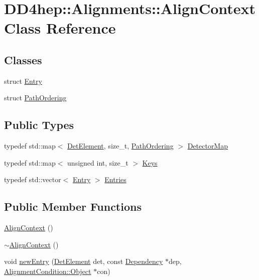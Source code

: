 \hypertarget{class_d_d4hep_1_1_alignments_1_1_align_context}{
\section{DD4hep::Alignments::AlignContext Class Reference}
\label{class_d_d4hep_1_1_alignments_1_1_align_context}
}
\subsection*{Classes}
\begin{DoxyCompactItemize}
\item 
struct \hyperlink{struct_d_d4hep_1_1_alignments_1_1_align_context_1_1_entry}{Entry}
\item 
struct \hyperlink{struct_d_d4hep_1_1_alignments_1_1_align_context_1_1_path_ordering}{PathOrdering}
\end{DoxyCompactItemize}
\subsection*{Public Types}
\begin{DoxyCompactItemize}
\item 
typedef std::map$<$ \hyperlink{namespace_d_d4hep_a21dd977310ff183f61ca6ae14b59a989}{DetElement}, size\_\-t, \hyperlink{struct_d_d4hep_1_1_alignments_1_1_align_context_1_1_path_ordering}{PathOrdering} $>$ \hyperlink{class_d_d4hep_1_1_alignments_1_1_align_context_a87b50a8f7563aefb2944aebe2d5bb33e}{DetectorMap}
\item 
typedef std::map$<$ unsigned int, size\_\-t $>$ \hyperlink{class_d_d4hep_1_1_alignments_1_1_align_context_afed2b1b68f90bb0129bd51a08904332b}{Keys}
\item 
typedef std::vector$<$ \hyperlink{struct_d_d4hep_1_1_alignments_1_1_align_context_1_1_entry}{Entry} $>$ \hyperlink{class_d_d4hep_1_1_alignments_1_1_align_context_a1b5a088a6d88177089055193c11aa67c}{Entries}
\end{DoxyCompactItemize}
\subsection*{Public Member Functions}
\begin{DoxyCompactItemize}
\item 
\hyperlink{class_d_d4hep_1_1_alignments_1_1_align_context_a0340e8218e8b1ffc12521b5d17bcdb90}{AlignContext} ()
\item 
\hyperlink{class_d_d4hep_1_1_alignments_1_1_align_context_ab283a69726f22fa38ab82b93286c9ab9}{$\sim$AlignContext} ()
\item 
void \hyperlink{class_d_d4hep_1_1_alignments_1_1_align_context_aff6f08db18fa6c1ff668371240ee438a}{newEntry} (\hyperlink{namespace_d_d4hep_a21dd977310ff183f61ca6ae14b59a989}{DetElement} det, const \hyperlink{class_d_d4hep_1_1_conditions_1_1_condition_dependency}{Dependency} $\ast$dep, \hyperlink{class_d_d4hep_1_1_alignments_1_1_interna_1_1_alignment_condition_object}{AlignmentCondition::Object} $\ast$con)
\end{DoxyCompactItemize}
